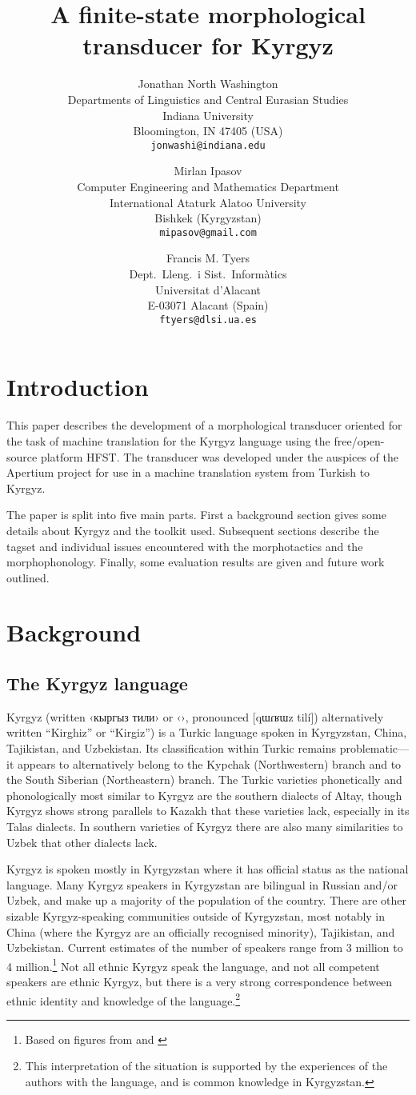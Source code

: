 \documentclass[10pt,a4paper,twocolumn]{article}
\title{A finite-state morphological transducer for Kyrgyz}
\author{Jonathan North Washington\\
Departments of Linguistics and Central Eurasian Studies\\
Indiana University\\
Bloomington, IN 47405 (USA)\\
\texttt{jonwashi@indiana.edu} \and
Mirlan Ipasov\\
Computer Engineering and Mathematics Department\\
International Ataturk Alatoo University\\
Bishkek (Kyrgyzstan)\\
\texttt{mipasov@gmail.com} \and
Francis M. Tyers\\
Dept.\ Lleng.\ i Sist.\ Informàtics \\  
Universitat d'Alacant\\
E-03071 Alacant (Spain)\\
\texttt{ftyers@dlsi.ua.es} 
 }
\date{}
\begin{document}
\maketitleabstract{}
\pagestyle{empty}


\section{Introduction}
This paper describes the development of a morphological transducer oriented for the task of machine translation for the Kyrgyz language using the free/open-source platform HFST. The transducer was developed under the auspices of the Apertium \citep{forcada2011} project for use in a machine translation system from Turkish to Kyrgyz.

The paper is split into five main parts. First a background section gives some details about Kyrgyz and the toolkit used. Subsequent sections describe the tagset and individual issues encountered with the morphotactics and the morphophonology. Finally, some evaluation results are given and future work outlined.

\section{Background}
\subsection{The Kyrgyz language}
Kyrgyz (written ‹кыргыз тили› or ‹›, pronounced [{\qipa qɯɾʁɯz tilí}]) alternatively written ``Kirghiz'' or ``Kirgiz'') is a Turkic language spoken in Kyrgyzstan, China, Tajikistan, and Uzbekistan.  Its classification within Turkic remains problematic—it appears to alternatively belong to the Kypchak (Northwestern) branch and to the South Siberian (Northeastern) branch.  The Turkic varieties phonetically and phonologically most similar to Kyrgyz are the southern dialects of Altay, though Kyrgyz shows strong parallels to Kazakh that these varieties lack, especially in its Talas dialects.  In southern varieties of Kyrgyz there are also many similarities to Uzbek that other dialects lack.

Kyrgyz is spoken mostly in Kyrgyzstan where it has official status as the national language.  Many Kyrgyz speakers in Kyrgyzstan are bilingual in Russian and/or Uzbek, and make up a majority of the population of the country.  There are other sizable Kyrgyz-speaking communities outside of Kyrgyzstan, most notably in China (where the Kyrgyz are an officially recognised minority), Tajikistan, and Uzbekistan.  Current estimates of the number of speakers range from 3 million to 4 million.\footnote{Based on figures from \cite{lewis2009} and \cite{factbook2009}}  Not all ethnic Kyrgyz speak the language, and not all competent speakers are ethnic Kyrgyz, but there is a very strong correspondence between ethnic identity and knowledge of the language.\footnote{This interpretation of the situation is supported by the experiences of the authors with the language, and is common knowledge in Kyrgyzstan.}
\end{document}
